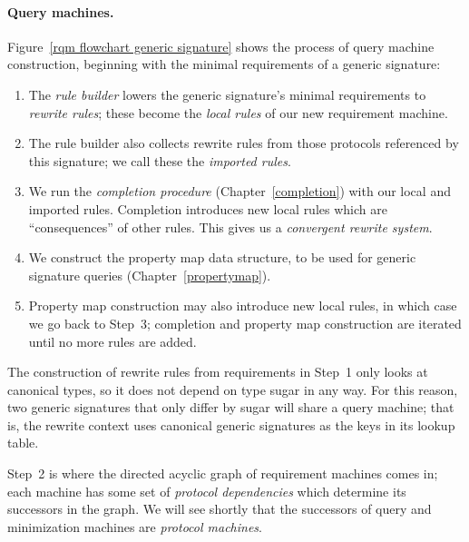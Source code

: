 \documentclass[../generics]{subfiles}
\begin{document}
\paragraph{Query machines.}
Figure~\ref{rqm flowchart generic signature} shows the process of query machine construction, beginning with the minimal requirements of a generic signature:
\begin{enumerate}
\item The \emph{rule builder} lowers the generic signature's minimal requirements to \emph{rewrite rules}; these become the \emph{local rules} of our new requirement machine.

\item The rule builder also collects rewrite rules from those protocols referenced by this signature; we call these the \emph{imported rules}.

\item We run the \emph{completion procedure} (Chapter~\ref{completion}) with our local and imported rules. Completion introduces new local rules which are ``consequences'' of other rules. This gives us a \emph{convergent rewrite system}.

\item We construct the property map data structure, to be used for generic signature queries (Chapter~\ref{propertymap}). 

\item Property map construction may also introduce new local rules, in which case we go back to Step~3; completion and property map construction are iterated until no more rules are added.
\end{enumerate}

The construction of rewrite rules from requirements in Step~1 only looks at canonical types, so it does not depend on type sugar in any way. For this reason, two generic signatures that only differ by sugar will share a query machine; that is, the rewrite context uses canonical generic signatures as the keys in its lookup table.

Step~2 is where the directed acyclic graph of requirement machines comes in; each machine has some set of \emph{protocol dependencies} which determine its successors in the graph. We will see shortly that the successors of query and minimization machines are \emph{protocol machines}.
\end{document}
